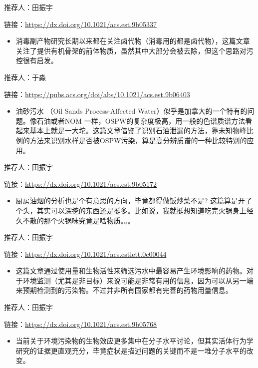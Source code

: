 \documentclass[]{book}
\providecommand{\tightlist}{%
  \setlength{\itemsep}{0pt}\setlength{\parskip}{0pt}}
\begin{document}
推荐人：田振宇

链接：\url{https://dx.doi.org/10.1021/acs.est.9b05337}

\begin{itemize}
\tightlist
\item
  消毒副产物研究长期以来都在关注卤代物（消毒用的都是卤代物），这篇文章关注了提供有机骨架的前体物质，虽然其中大部分会被去除，但这个思路对污控很有启发。
\end{itemize}

推荐人：于淼

链接：\url{https://pubs.acs.org/doi/abs/10.1021/acs.est.9b06403}

\begin{itemize}
\tightlist
\item
  油砂污水 （Oil Sands Process-Affected Water）似乎是加拿大的一个特有的问题。像石油或者NOM 一样，OSPW的复杂度极高，用一般的色谱质谱方法看起来基本上就是一大坨。这篇文章借鉴了识别石油泄漏的方法，靠未知物峰比例的方法来识别水样是否被OSPW污染，算是高分辨质谱的一种比较特别的应用。
\end{itemize}

推荐人：田振宇

链接：\url{https://dx.doi.org/10.1021/acs.est.9b05172}

\begin{itemize}
\tightlist
\item
  厨房油烟的分析也是个有意思的方向，毕竟都得做饭炒菜不是? 这篇算是开了个头，其实可以深挖的东西还是挺多。比如说，我就挺想知道吃完火锅身上经久不散的那个火锅味究竟是啥物质。。。
\end{itemize}

推荐人：田振宇

链接：\url{https://dx.doi.org/10.1021/acs.estlett.0c00044}

\begin{itemize}
\tightlist
\item
  这篇文章通过使用量和生物活性来筛选污水中最容易产生环境影响的药物。对于环境监测（尤其是非目标）来说可能是非常有用的信息，因为可以从另一端来预期检测到的污染物。不过并非所有国家都有完善的药物用量信息。
\end{itemize}

推荐人：田振宇

链接：\url{https://dx.doi.org/10.1021/acs.est.9b05768}

\begin{itemize}
\tightlist
\item
  当前关于环境污染物的生物效应更多集中在分子水平讨论，但其实活体行为学研究的证据更直观充分，毕竟症状是描述问题的关键而不是一堆分子水平的改变。
\end{itemize}
\end{document}
